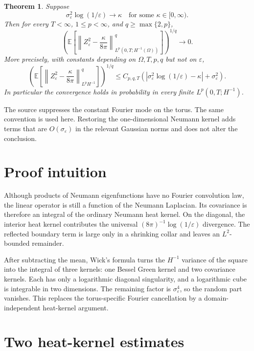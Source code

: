 \documentclass[11pt]{article}
\newtheorem{theorem}{Theorem}
\newcommand{\E}{\mathbb E}
\newcommand{\Om}{\Omega}
\begin{document}
\begin{theorem}\label{thm:main}
Suppose
\[
 \sigma_\varepsilon^2\log(1/\varepsilon)\longrightarrow\kappa
 \quad\text{for some }\kappa\in[0,\infty).
\]
Then for every $T<\infty$, $1\leq p<\infty$, and
$q\geq\max\{2,p\}$,
\[
 \left(\E\left[
 \left\|Z_\varepsilon^2-\frac{\kappa}{8\pi}\right\|_
 {L^p(0,T;H^{-1}(\Om))}^{q}
 \right]\right)^{1/q}\longrightarrow0.
\]
More precisely, with constants depending on $\Om,T,p,q$ but not on
$\varepsilon$,
\begin{equation}\label{eq:rate}
 \left(\E\left[
 \left\|Z_\varepsilon^2-\frac{\kappa}{8\pi}\right\|_
 {L^pH^{-1}}^{q}
 \right]\right)^{1/q}
 \leq C_{p,q,T}
 \left(\left|\sigma_\varepsilon^2\log(1/\varepsilon)-\kappa\right|
       +\sigma_\varepsilon^2\right).
\end{equation}
In particular the convergence holds in probability in every finite
$L^p(0,T;H^{-1})$.
\end{theorem}

The source suppresses the constant Fourier mode on the torus.  The same
convention is used here.  Restoring the one-dimensional Neumann kernel adds
terms that are $O(\sigma_\varepsilon)$ in the relevant Gaussian norms and
does not alter the conclusion.

\section{Proof intuition}

Although products of Neumann eigenfunctions have no Fourier convolution law,
the linear operator is still a function of the Neumann Laplacian.  Its
covariance is therefore an integral of the ordinary Neumann heat kernel.  On
the diagonal, the interior heat kernel contributes the universal
$(8\pi)^{-1}\log(1/\varepsilon)$ divergence.  The reflected boundary term is
large only in a shrinking collar and leaves an $L^2$-bounded remainder.

After subtracting the mean, Wick's formula turns the $H^{-1}$ variance of the
square into the integral of three kernels: one Bessel Green kernel and two
covariance kernels.  Each has only a logarithmic diagonal singularity, and a
logarithmic cube is integrable in two dimensions.  The remaining factor is
$\sigma_\varepsilon^4$, so the random part vanishes.  This replaces the
torus-specific Fourier cancellation by a domain-independent heat-kernel
argument.

\section{Two heat-kernel estimates}
\end{document}
